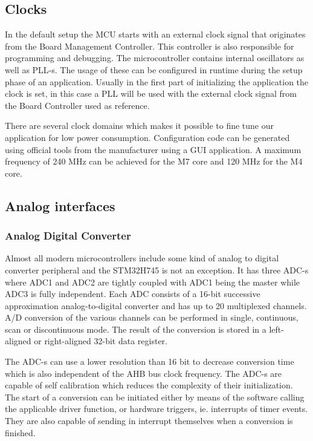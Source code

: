 \subsection{Clocks}

In the default setup the MCU starts with an external clock signal that originates from the Board Management Controller. This controller is also responsible for programming and debugging. The microcontroller contains internal oscillators as well as PLL-s. The usage of these can be configured in runtime during the setup phase of an application. Usually in the first part of initializing the application the clock is set, in this case a PLL will be used with the external clock signal from the Board Controller used as reference.

There are several clock domains which makes it possible to fine tune our application for low power consumption. Configuration code can be generated using official tools from the manufacturer using a GUI application. A maximum frequency of 240 MHz can be achieved for the M7 core and 120 MHz for the M4 core.

\subsection{Analog interfaces}

\subsubsection{Analog Digital Converter}

Almost all modern microcontrollers include some kind of analog to digital converter peripheral and the STM32H745 is not an exception. \cite{ADCDescription} It has three ADC-s where ADC1 and ADC2 are tightly coupled with ADC1 being the master while ADC3 is fully independent. Each ADC consists of a 16-bit successive approximation analog-to-digital converter and has up to 20 multiplexed channels. A/D conversion of the various channels can be performed in single, continuous, scan or discontinuous mode. The result of the conversion is stored in a left-aligned or right-aligned 32-bit data register.

The ADC-s can use a lower resolution than 16 bit to decrease conversion time which is also independent of the AHB bus clock frequency. The ADC-s are capable of self calibration which reduces the complexity of their initialization. The start of a conversion can be initiated either by means of the software calling the applicable driver function, or hardware triggers, ie. interrupts of timer events. They are also capable of sending in interrupt themselves when a conversion is finished.

